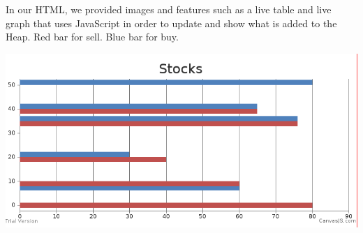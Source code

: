 In our H\+T\+M\+L, we provided images and features such as a live table and live graph that uses Java\+Script in order to update and show what is added to the Heap. Red bar for sell. Blue bar for buy.

 
\includegraphics[scale=0.5]{../america.png}
 